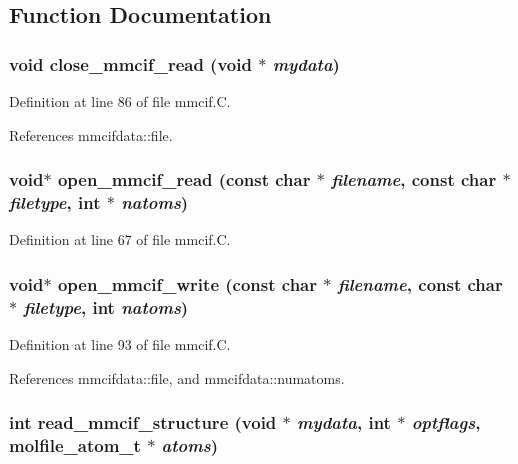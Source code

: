 \subsection{Function Documentation}
\subsubsection{\setlength{\rightskip}{0pt plus 5cm}void close\_\-mmcif\_\-read (void $\ast$ {\em mydata})\hspace{0.3cm}{\tt  [static]}}\label{mmcif_8C_a4}




Definition at line 86 of file mmcif.C.

References mmcifdata::file.
\subsubsection{\setlength{\rightskip}{0pt plus 5cm}void$\ast$ open\_\-mmcif\_\-read (const char $\ast$ {\em filename}, const char $\ast$ {\em filetype}, int $\ast$ {\em natoms})\hspace{0.3cm}{\tt  [static]}}\label{mmcif_8C_a1}




Definition at line 67 of file mmcif.C.
\subsubsection{\setlength{\rightskip}{0pt plus 5cm}void$\ast$ open\_\-mmcif\_\-write (const char $\ast$ {\em filename}, const char $\ast$ {\em filetype}, int {\em natoms})\hspace{0.3cm}{\tt  [static]}}\label{mmcif_8C_a5}




Definition at line 93 of file mmcif.C.

References mmcifdata::file, and mmcifdata::numatoms.
\subsubsection{\setlength{\rightskip}{0pt plus 5cm}int read\_\-mmcif\_\-structure (void $\ast$ {\em mydata}, int $\ast$ {\em optflags}, {\bf molfile\_\-atom\_\-t} $\ast$ {\em atoms})\hspace{0.3cm}{\tt  [static]}}\label{mmcif_8C_a2}




